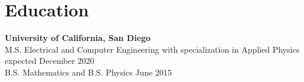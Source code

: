 \section{Education}

{\bf University of California, San Diego} \\
\hspace{0.25in}
    M.S. Electrical and Computer Engineering with specialization in Applied Physics
    \hfill expected December 2020 \\
\hspace{0.25in}
    B.S. Mathematics and 
    B.S. Physics
    \hfill June 2015

